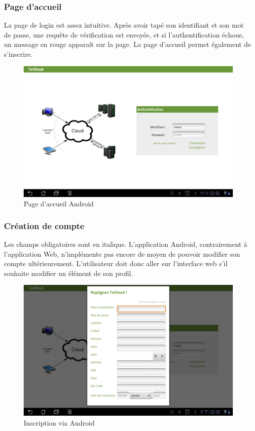\documentclass[a4paper,12pt]{article}
\begin{document}
\subsubsection{Page d'accueil}
La page de login est assez intuitive. Après avoir tapé son identifiant et son mot de passe, une requête de vérification est envoyée, et si l'authentification échoue, un message en rouge apparaît sur la page. La page d'accueil permet également de s'inscrire.
\begin{figure}[!ht]
\begin{center}
  \includegraphics[width=1\textwidth]{./images/screenshot/android_accueil.png}
\end{center}
  \caption{Page d'accueil Android}
  \label{Page d'accueil Android}
\end{figure}
\newpage
\subsubsection{Création de compte}
Les champs obligatoires sont en italique. L'application Android, contrairement à l'application Web, n'implémente pas encore de moyen de pouvoir modifier son compte ultérieurement. L'utilisateur doit donc aller sur l'interface web s'il souhaite modifier un 
élément de son profil. 
\begin{figure}[!ht]
\begin{center}
  \includegraphics[width=1\textwidth]{./images/screenshot/inscription_android.png}
\end{center}
  \caption{Inscription via Android}
  \label{Inscription via Android}
\end{figure}
\end{document}
